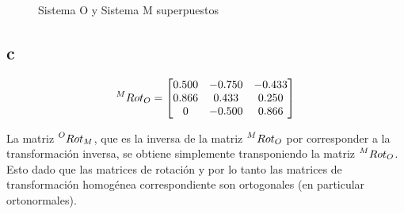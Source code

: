 \documentclass[a4paper,12pt]{article}
\begin{document}
\begin{figure}[H]
    \centering
    \begin{adjustbox}{scale = 0.85, max width=\columnwidth}
    \end{adjustbox}
    \caption{Sistema O y Sistema M superpuestos}
\end{figure}

\subsection{c}
\begin{equation*}
    \prescript{M}{}{Rot_O} = 
    \begin{bmatrix}
        0.500  &  -0.750  & -0.433 \\
        0.866  &  0.433   & 0.250 \\
        0      & -0.500   & 0.866
    \end{bmatrix}
\end{equation*}

La matriz $\prescript{O}{}{Rot_M}$, que es la inversa de la matriz $\prescript{M}{}{Rot_O}$ por corresponder a la transformación inversa,
se obtiene simplemente transponiendo la matriz $\prescript{M}{}{Rot_O}$. Esto dado que las matrices de rotación y por lo tanto las matrices de 
transformación homogénea correspondiente son ortogonales (en particular ortonormales).
\end{document}
